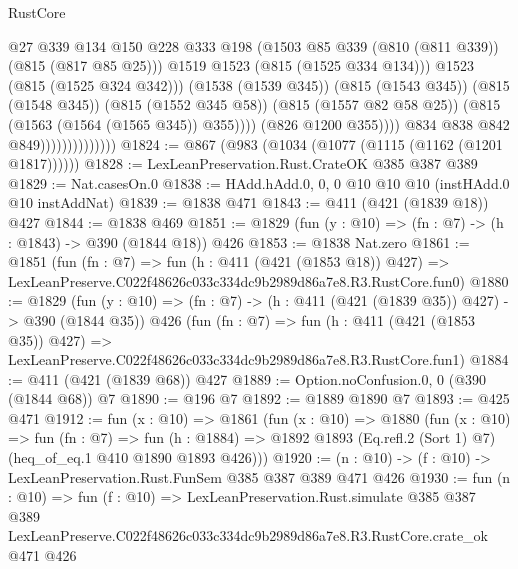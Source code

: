 \begin{lexlean}{RustCore}
\begin{coremodule}
                                              @27
                                              @339
                                              @134
                                              @150
                                              @228
                                              @333
                                              @198
                                              (@1503
                                                @85
                                                @339
                                                (@810 (@811 @339))
                                                (@815 (@817 @85 @25)))
                                              @1519
                                              @1523
                                              (@815 (@1525 @334 @134)))
                                            @1523
                                            (@815 (@1525 @324 @342)))
                                          (@1538 (@1539 @345))
                                          (@815 (@1543 @345))
                                          (@815 (@1548 @345))
                                          (@815 (@1552 @345 @58))
                                          (@815 (@1557 @82 @58 @25))
                                          (@815 (@1563 (@1564 (@1565 @345)) @355))))
                                      (@826 @1200 @355))))
                                @834
                                @838
                                @842
                                @849))))))))))))))
@1824 := @867 (@983 (@1034 (@1077 (@1115 (@1162 (@1201 @1817))))))
@1828 := LexLeanPreservation.Rust.CrateOK @385 @387 @389
@1829 := Nat.casesOn.{0}
@1838 := HAdd.hAdd.{0, 0, 0} @10 @10 @10 (instHAdd.{0} @10 instAddNat)
@1839 := @1838 @471
@1843 := @411 (@421 (@1839 @18)) @427
@1844 := @1838 @469
@1851 := @1829 (fun (y : @10) => (fn : @7) -> (h : @1843) -> @390 (@1844 @18)) @426
@1853 := @1838 Nat.zero
@1861 := @1851
    (fun (fn : @7) =>
    fun (h : @411 (@421 (@1853 @18)) @427) =>
    LexLeanPreserve.C022f48626c033c334dc9b2989d86a7e8.R3.RustCore.fun0)
@1880 := @1829
    (fun (y : @10) => (fn : @7) -> (h : @411 (@421 (@1839 @35)) @427) -> @390 (@1844 @35))
    @426
    (fun (fn : @7) =>
    fun (h : @411 (@421 (@1853 @35)) @427) =>
    LexLeanPreserve.C022f48626c033c334dc9b2989d86a7e8.R3.RustCore.fun1)
@1884 := @411 (@421 (@1839 @68)) @427
@1889 := Option.noConfusion.{0, 0} (@390 (@1844 @68)) @7
@1890 := @196 @7
@1892 := @1889 @1890 @7
@1893 := @425 @471
@1912 := fun (x : @10) =>
  @1861
    (fun (x : @10) =>
    @1880
      (fun (x : @10) =>
      fun (fn : @7) =>
      fun (h : @1884) =>
      @1892 @1893 (Eq.refl.{2} (Sort 1) @7) (heq_of_eq.{1} @410 @1890 @1893 @426)))
@1920 := (n : @10) -> (f : @10) -> LexLeanPreservation.Rust.FunSem @385 @387 @389 @471 @426
@1930 := fun (n : @10) =>
  fun (f : @10) =>
  LexLeanPreservation.Rust.simulate
    @385
    @387
    @389
    LexLeanPreserve.C022f48626c033c334dc9b2989d86a7e8.R3.RustCore.crate_ok
    @471
    @426
\end{coremodule}
\end{lexlean}
